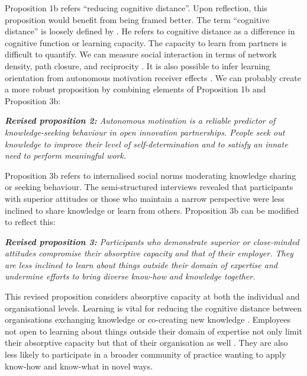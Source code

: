 Proposition 1b refers \enquote{reducing cognitive distance}. Upon reflection, this proposition would benefit from being framed better. The term \enquote{cognitive distance} is loosely defined by \citet{nooteboom2000learning}. He refers to cognitive distance as a difference in cognitive function or learning capacity. The capacity to learn from partners is difficult to quantify. We can measure social interaction in terms of network density, path closure, and reciprocity \citep{reagans2003network, marsden2012reflections, phelps2012knowledge}. It is also possible to infer learning orientation from autonomous motivation receiver effects \citep{gagne2009model,gubbins2021delineating}. We can probably create a more robust proposition by combining elements of Proposition 1b and Proposition 3b: \bigskip

\begin{tcolorbox}
\textit{\textbf{Revised proposition 2:} Autonomous motivation is a reliable predictor of knowledge-seeking behaviour in open innovation partnerships. People seek out knowledge to improve their level of self-determination and to satisfy an innate need to perform meaningful work.}
\end{tcolorbox}

Proposition 3b refers to internalised social norms moderating knowledge sharing or seeking behaviour. The semi-structured interviews revealed that participants with superior attitudes or those who maintain a narrow perspective were less inclined to share knowledge or learn from others. Proposition 3b can be modified to reflect this: \bigskip

\begin{tcolorbox}
\textit{\textbf{Revised proposition 3:} Participants who demonstrate superior or close-minded attitudes compromise their absorptive capacity and that of their employer. They are less inclined to learn about things outside their domain of expertise and undermine efforts to bring diverse know-how and knowledge together.}
\end{tcolorbox}

This revised proposition considers absorptive capacity at both the individual and organisational levels. Learning is vital for reducing the cognitive distance between organisations exchanging knowledge or co-creating new knowledge \citep{nooteboom2000learning}. Employees not open to learning about things outside their domain of expertise not only limit their absorptive capacity but that of their organisation as well \citep{yildiz2019fosters}. They are also less likely to participate in a broader community of practice wanting to apply know-how and know-what in novel ways. \medskip

